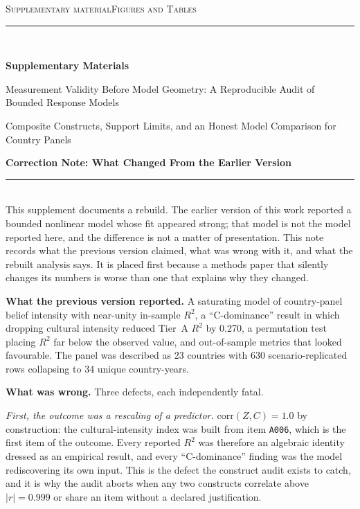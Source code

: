 \documentclass[11pt]{article}
\newcommand{\Rule}{\color{black}\rule{\linewidth}{0.6pt}}
\newcommand{\SubRule}{\color{black}\rule{\linewidth}{0.4pt}}
\newcommand{\Section}[1]{\noindent\textbf{#1}\\[-0.25em]\SubRule\\[0.1em]}
\begin{document}
\renewcommand{\thefigure}{S\arabic{figure}}
\renewcommand{\thetable}{S\arabic{table}}
\setcounter{figure}{0}
\setcounter{table}{0}
\thispagestyle{empty}
{\small\textsc{Supplementary material}}\hfill{\small\textsc{Figures and Tables}}\\[-0.35em]
\Rule\\[0.3em]
\begin{center}
    {\LARGE\bfseries Supplementary Materials}\par
{\large Measurement Validity Before Model Geometry: A Reproducible Audit of Bounded Response Models}\par
{\normalsize Composite Constructs, Support Limits, and an Honest Model Comparison for Country Panels}\par
\end{center}
\par

\vspace{0.5em}

\Section{Correction Note: What Changed From the Earlier Version}

\noindent\justifying
This supplement documents a rebuild. The earlier version of this work reported a bounded nonlinear model whose fit appeared strong; that model is not the model reported here, and the difference is not a matter of presentation. This note records what the previous version claimed, what was wrong with it, and what the rebuilt analysis says. It is placed first because a methods paper that silently changes its numbers is worse than one that explains why they changed.

\noindent\justifying
\textbf{What the previous version reported.} A saturating model of country-panel belief intensity with near-unity in-sample $R^2$, a ``C-dominance'' result in which dropping cultural intensity reduced Tier~A $R^2$ by 0.270, a permutation test placing $R^2$ far below the observed value, and out-of-sample metrics that looked favourable. The panel was described as 23 countries with 630 scenario-replicated rows collapsing to 34 unique country-years.

\noindent\justifying
\textbf{What was wrong.} Three defects, each independently fatal.

\emph{First, the outcome was a rescaling of a predictor.} $\mathrm{corr}(Z, C) = 1.0$ by construction: the cultural-intensity index was built from item \texttt{A006}, which is the first item of the outcome. Every reported $R^2$ was therefore an algebraic identity dressed as an empirical result, and every ``C-dominance'' finding was the model rediscovering its own input. This is the defect the construct audit exists to catch, and it is why the audit aborts when any two constructs correlate above $|r| = 0.999$ or share an item without a declared justification.
\end{document}
